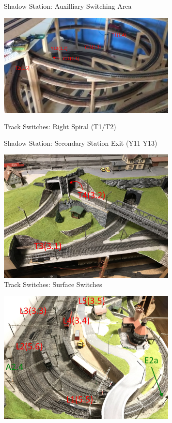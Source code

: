 \documentclass{scrreprt}
\begin{document}
\begin{appendices}
\begin{figure}[h!]
    \caption{Shadow Station: Auxilliary Switching Area}
\end{figure}
\begin{figure}[h!]
    \centering
    \includegraphics[width=0.8\textwidth]{ref/yard secondary exit and track spiral}
    \caption{Shadow Station: Secondary Station Exit (Y11-Y13)}
				Track Switches: Right Spiral (T1/T2)
\end{figure}
\begin{figure}[h!]
	\centering
	\includegraphics[width=0.8\textwidth]{ref/track top}
	\caption{Track Switches: Surface Switches}
\end{figure}
\begin{figure}[h!]
	\centering
	\includegraphics[width=0.8\textwidth]{ref/left overview}

\end{figure}
\end{appendices}
\end{document}
